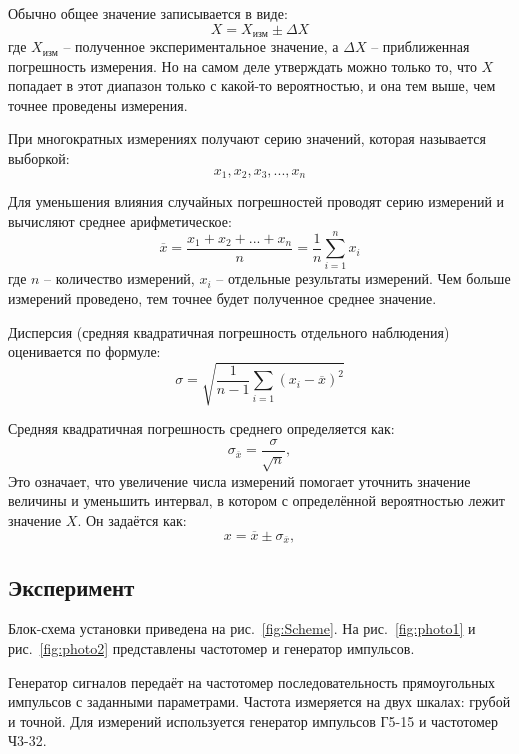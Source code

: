Обычно общее значение записывается в виде:
\begin{equation}
    X=X_{изм}\pm \Delta X
\end{equation}
где $X_{изм}$ -- полученное экспериментальное значение, а $\Delta X$ -- приближенная погрешность измерения. Но на самом деле утверждать можно только то, что $X$ попадает в этот диапазон только с какой-то вероятностью, и она тем выше, чем точнее проведены измерения.

При многократных измерениях получают серию значений, которая называется выборкой:
\begin{equation}
    x_1,x_2,x_3, ..., x_n
\end{equation}

Для уменьшения влияния случайных погрешностей проводят серию измерений и вычисляют среднее арифметическое:
\begin{equation}
    \overline{x}=\frac{x_1+x_2+...+x_n}{n}=\frac{1}{n}\sum_{i=1}^{n} x_i
\end{equation}
где $n$ -- количество измерений, $x_i$ -- отдельные результаты измерений. Чем больше измерений проведено, тем точнее будет полученное среднее значение.

Дисперсия (средняя квадратичная погрешность отдельного наблюдения) оценивается по формуле:
\begin{equation}
    \sigma=\sqrt{\frac{1}{n-1}\sum_{i=1} (x_i-\overline{x})^2}
\end{equation}

Средняя квадратичная погрешность среднего определяется как:
\begin{equation}
    \sigma_{\overline{x}}=\frac{\sigma}{\sqrt{n}} ,
\end{equation}
Это означает, что увеличение числа измерений помогает уточнить значение величины и уменьшить интервал, в котором с определённой вероятностью лежит значение $X$. Он задаётся как:
\begin{equation}
    x=\overline{x}\pm\sigma_{\overline{x}} ,
\end{equation}

\subsection{Эксперимент}
Блок-схема установки приведена на рис.~\ref{fig:Scheme}. На рис.~\ref{fig:photo1} и рис.~\ref{fig:photo2} представлены частотомер и генератор импульсов.

Генератор сигналов передаёт на частотомер последовательность прямоугольных импульсов с заданными параметрами. Частота измеряется на двух шкалах: грубой и точной. Для измерений используется генератор импульсов Г5-15 и частотомер Ч3-32.

